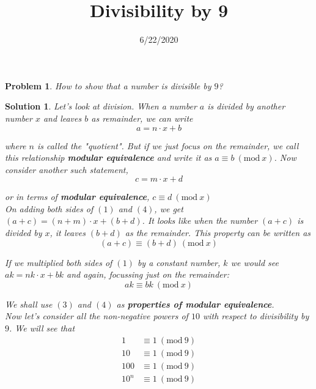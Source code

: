 \documentclass{article}
\title{Divisibility by 9}
\date{6/22/2020}
\newtheorem*{problem*}{Problem}
\newtheorem*{solution*}{Solution}
\newcommand{\Mod}[1]{\ (\mathrm{mod}\ #1)}
\begin{document}
\maketitle
 
\begin{problem*}
    How to show that a number is divisible by $9$?
\end{problem*}

\begin{solution*}
    Let's look at division. When a number $a$ is divided by another
    number $x$ and leaves $b$ as remainder, we can write
    \begin{equation}
        a = n \cdot x + b
    \end{equation}
    
    where $n$ is called the "quotient". But if we just focus on the 
    remainder, we call this relationship \textbf{modular equivalence}
    and write it as $a \equiv b \Mod x$. Now consider another such statement,
    \begin{equation}
        c = m \cdot x + d
    \end{equation}

    or in terms of \textbf{modular equivalence},
    $c \equiv d \Mod x$\\

    On adding both sides of $(1)$ and $(4)$, we get 
    $(a+c) = (n+m) \cdot x + (b+d)$. It looks like
    when the number $(a+c)$ is divided by $x$, it leaves
    $(b+d)$ as the remainder. This property can be written as
    \begin{equation}
        (a+c) \equiv (b+d) \Mod x
    \end{equation}

    If we multiplied both sides of $(1)$ by a constant number, $k$
    we would see $ak = nk \cdot x + bk$ and again, focussing just on the remainder:
    \begin{equation}
        ak \equiv bk \Mod x
    \end{equation}

    We shall use $(3)$ and $(4)$ as \textbf{properties of modular equivalence}.\\

    Now let's consider all the non-negative powers of $10$
    with respect to divisibility by $9$. We will see that
    \begin{align*}
        1 &\equiv 1 \Mod 9\\
        10 &\equiv 1 \Mod 9\\
        100 &\equiv 1 \Mod 9\\
        10^n &\equiv 1 \Mod 9\\
    \end{align*}


\end{solution*}
\end{document}

